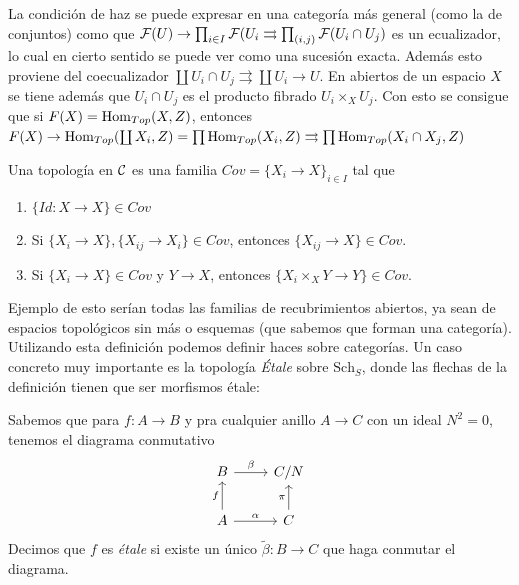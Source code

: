 \documentclass[GA.tex]{subfiles}
\begin{document}
\begin{nota}
La condición de haz se puede expresar en una categoría más general (como la de conjuntos) como que $\mathcal{F}(U)\to\prod_{i\in I}\mathcal{F}(U_i\rightrightarrows \prod_{(i,j)}\mathcal{F}(U_i\cap U_j)$ es un ecualizador, lo cual en cierto sentido se puede ver como una sucesión exacta. Además esto proviene del coecualizador $\coprod U_i\cap U_j\rightrightarrows \coprod U_i\to U$. En abiertos de un espacio $X$ se tiene además que $U_i\cap U_j$ es el producto fibrado $U_i\times_X U_j$. Con esto se consigue que si $F(X)=\operatorname{Hom}_{Top}(X,Z)$, entonces $F(X)\to \operatorname{Hom}_{Top}(\coprod X_i, Z)=\prod\operatorname{Hom}_{Top}(X_i,Z)\rightrightarrows \prod\operatorname{Hom}_{Top}(X_i\cap X_j,Z)$
\end{nota}

\begin{defi}
Una topología en $\mathcal{C}$ es una familia $Cov=\{X_i\to X\}_{i\in I}$ tal que
\begin{enumerate}
\item $\{Id:X\to X\}\in Cov$
\item  Si $\{X_i\to X\}, \{X_{ij}\to X_i\}\in Cov$, entonces $\{X_{ij}\to X\}\in Cov$.
\item Si $\{X_i\to X\}\in Cov$ y $Y\to X$, entonces $\{X_i\times_X Y\to Y\}\in Cov$. 
\end{enumerate} 
\end{defi}
Ejemplo de esto serían todas las familias de recubrimientos abiertos, ya sean de espacios topológicos sin más o esquemas (que sabemos que forman una categoría). Utilizando esta definición podemos definir haces sobre categorías. Un caso concreto muy importante es la topología \emph{Étale} sobre $\mathrm{Sch}_S$, donde las flechas de la definición tienen que ser morfismos étale:
\begin{defi}
Sabemos que para $f:A\to B$ y pra cualquier anillo $A\to C$ con un ideal $N^2=0$, tenemos el diagrama conmutativo
\[
\begin{tikzcd}
B \arrow[r, "\beta"] & C/N\\
A\arrow[u, "f"]\arrow[r, "\alpha"] & C\arrow[u, "\pi"]
\end{tikzcd}
\]
Decimos que $f$ es \emph{étale} si existe un único $\tilde{\beta}:B\to C$ que haga conmutar el diagrama. 
\end{defi}
\end{document}
